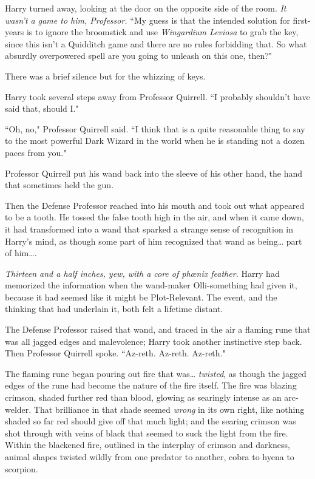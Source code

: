 Harry turned away, looking at the door on the opposite side of the room. \emph{It wasn't a game to him, Professor.} ``My guess is that the intended solution for first-years is to ignore the broomstick and use \emph{Wingardium Leviosa} to grab the key, since this isn't a Quidditch game and there are no rules forbidding that. So what absurdly overpowered spell are you going to unleash on this one, then?"

There was a brief silence but for the whizzing of keys.

Harry took several steps away from Professor Quirrell. ``I probably shouldn't have said that, should I."

``Oh, no," Professor Quirrell said. ``I think that is a quite reasonable thing to say to the most powerful Dark Wizard in the world when he is standing not a dozen paces from you."

Professor Quirrell put his wand back into the sleeve of his other hand, the hand that sometimes held the gun.

Then the Defense Professor reached into his mouth and took out what appeared to be a tooth. He tossed the false tooth high in the air, and when it came down, it had transformed into a wand that sparked a strange sense of recognition in Harry's mind, as though some part of him recognized that wand as being{\ldots} part of him{\ldots}.

\emph{Thirteen and a half inches, yew, with a core of phœnix feather.} Harry had memorized the information when the wand-maker Olli-something had given it, because it had seemed like it might be Plot-Relevant. The event, and the thinking that had underlain it, both felt a lifetime distant.

The Defense Professor raised that wand, and traced in the air a flaming rune that was all jagged edges and malevolence; Harry took another instinctive step back. Then Professor Quirrell spoke. ``Az-reth. Az-reth. Az-reth."

The flaming rune began pouring out fire that was{\ldots} \emph{twisted}, as though the jagged edges of the rune had become the nature of the fire itself. The fire was blazing crimson, shaded further red than blood, glowing as searingly intense as an arc-welder. That brilliance in that shade seemed \emph{wrong} in its own right, like nothing shaded so far red should give off that much light; and the searing crimson was shot through with veins of black that seemed to suck the light from the fire. Within the blackened fire, outlined in the interplay of crimson and darkness, animal shapes twisted wildly from one predator to another, cobra to hyena to scorpion.

